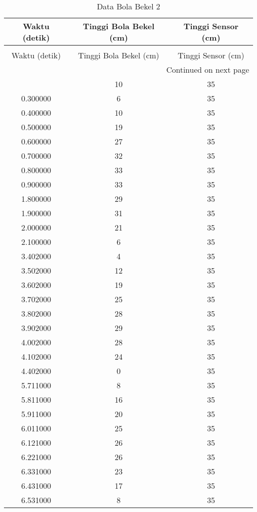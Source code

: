 \begin{longtable}[htbp]{|c|c|c|}
\caption{Data Bola Bekel 2} \\
\hline
Waktu (detik) & Tinggi Bola Bekel (cm) & Tinggi Sensor (cm) \\ \hline
\endfirsthead
\caption[]{Data Bola Bekel 2} \\
\hline
Waktu (detik) & Tinggi Bola Bekel (cm) & Tinggi Sensor (cm) \\ \hline
\endhead
\multicolumn{3}{r}{Continued on next page} \\
\endfoot
\endlastfoot
0.200000 & 10 & 35 \\ \hline
0.300000 & 6 & 35 \\ \hline
0.400000 & 10 & 35 \\ \hline
0.500000 & 19 & 35 \\ \hline
0.600000 & 27 & 35 \\ \hline
0.700000 & 32 & 35 \\ \hline
0.800000 & 33 & 35 \\ \hline
0.900000 & 33 & 35 \\ \hline
1.800000 & 29 & 35 \\ \hline
1.900000 & 31 & 35 \\ \hline
2.000000 & 21 & 35 \\ \hline
2.100000 & 6 & 35 \\ \hline
3.402000 & 4 & 35 \\ \hline
3.502000 & 12 & 35 \\ \hline
3.602000 & 19 & 35 \\ \hline
3.702000 & 25 & 35 \\ \hline
3.802000 & 28 & 35 \\ \hline
3.902000 & 29 & 35 \\ \hline
4.002000 & 28 & 35 \\ \hline
4.102000 & 24 & 35 \\ \hline
4.402000 & 0 & 35 \\ \hline
5.711000 & 8 & 35 \\ \hline
5.811000 & 16 & 35 \\ \hline
5.911000 & 20 & 35 \\ \hline
6.011000 & 25 & 35 \\ \hline
6.121000 & 26 & 35 \\ \hline
6.221000 & 26 & 35 \\ \hline
6.331000 & 23 & 35 \\ \hline
6.431000 & 17 & 35 \\ \hline
6.531000 & 8 & 35 \\ \hline

\end{longtable}
